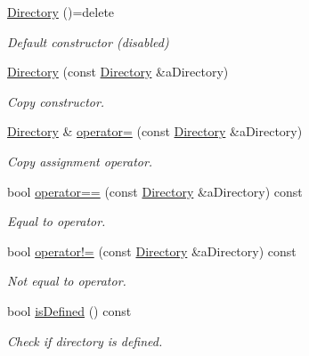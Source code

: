 \begin{DoxyCompactItemize}
\item 
\hyperlink{classlibrary_1_1core_1_1fs_1_1_directory_a3ec39f6cad19a81d520e9a1f2d8bb1f7}{Directory} ()=delete
\begin{DoxyCompactList}\small\item\em Default constructor (disabled) \end{DoxyCompactList}\item 
\hyperlink{classlibrary_1_1core_1_1fs_1_1_directory_a5685b48aa8a6332caf0e4e253d8471f7}{Directory} (const \hyperlink{classlibrary_1_1core_1_1fs_1_1_directory}{Directory} \&a\+Directory)
\begin{DoxyCompactList}\small\item\em Copy constructor. \end{DoxyCompactList}\item 
\hyperlink{classlibrary_1_1core_1_1fs_1_1_directory}{Directory} \& \hyperlink{classlibrary_1_1core_1_1fs_1_1_directory_ae49af93d5b45fd410634ab14d82a690a}{operator=} (const \hyperlink{classlibrary_1_1core_1_1fs_1_1_directory}{Directory} \&a\+Directory)
\begin{DoxyCompactList}\small\item\em Copy assignment operator. \end{DoxyCompactList}\item 
bool \hyperlink{classlibrary_1_1core_1_1fs_1_1_directory_a7d1a76c04ba3750606c3f22519d0ef66}{operator==} (const \hyperlink{classlibrary_1_1core_1_1fs_1_1_directory}{Directory} \&a\+Directory) const
\begin{DoxyCompactList}\small\item\em Equal to operator. \end{DoxyCompactList}\item 
bool \hyperlink{classlibrary_1_1core_1_1fs_1_1_directory_a5ecb69d28fb615ca5ee4f24ef74f1074}{operator!=} (const \hyperlink{classlibrary_1_1core_1_1fs_1_1_directory}{Directory} \&a\+Directory) const
\begin{DoxyCompactList}\small\item\em Not equal to operator. \end{DoxyCompactList}\item 
bool \hyperlink{classlibrary_1_1core_1_1fs_1_1_directory_a82654fb35d41e8cad43a50f4f609993f}{is\+Defined} () const
\begin{DoxyCompactList}\small\item\em Check if directory is defined. \end{DoxyCompactList}\item 

\end{DoxyCompactItemize}
